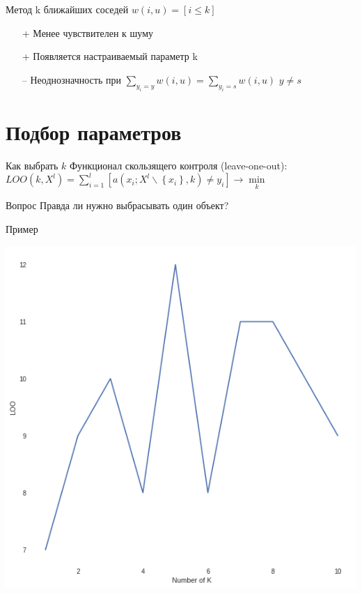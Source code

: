 \documentclass[10pt]{beamer}
\begin{document}
\begin{frame}{Метод k ближайших соседей}
	${w(i, u) = [i \leq k]}$\\
	\bigbreak
	\begin{itemize} [<+- | alert@+>]
		\item[+] Менее чувствителен к шуму
		\item[+] Появляется настраиваемый параметр k
	  \bigbreak
	  \item[--] Неоднозначность при ${\sum\limits_{y_i = y} w(i, u) = \sum\limits_{y_i = s} w(i, u)}$ \hspace{5mm} $y \neq s$
	\end{itemize}
\end{frame}

\section{Подбор параметров}

\begin{frame}{Как выбрать $k$}
	Функционал скользящего контроля (leave-one-out):\\
	\bigbreak
	${LOO(k, X^l) = \sum\limits_{i=1}^l [a(x_i; X^l \backslash \left\{x_i\right\}, k) \neq y_i] \rightarrow \min\limits_k}$\\
\end{frame}

\begin{frame}{Вопрос}
	Правда ли нужно выбрасывать один объект?
\end{frame}

\begin{frame}{Пример}
	\begin{center}
	  \includegraphics[width=\textwidth, height=0.8 \textheight, keepaspectratio]{images/loo}
	\end{center}
\end{frame}
\end{document}
